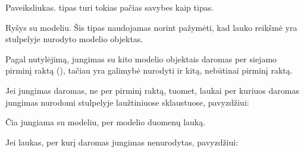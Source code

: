\documentclass[letterpaper,10pt,lithuanian]{sphinxmanual}
\begin{document}

\begin{fulllineitems}
\label{\detokenize{tipai:type.image}}
\pysigstartsignatures
\pysigline
{}
\pysigstopsignatures
\sphinxAtStartPar
Paveiksliukas.  tipas turi tokias pačias savybes kaip 
tipas.

\end{fulllineitems}


\begin{fulllineitems}
\label{\detokenize{tipai:type.ref}}
\pysigstartsignatures
\pysigline
{}
\pysigstopsignatures
\sphinxAtStartPar
Ryšys su modeliu. Šis tipas naudojamas norint pažymėti, kad lauko
reikšmė yra {\hyperref[\detokenize{dimensijos:property.ref}]{}} stulpelyje nurodyto modelio objektas.

\sphinxAtStartPar
Pagal nutylėjimą, jungimas su kito modelio objektais daromas per siejamo
pirminį raktą ({\hyperref[\detokenize{dimensijos:model.ref}]{}}), tačiau yra galimybė nurodyti ir kitą,
nebūtinai pirminį raktą.

\sphinxAtStartPar
Jei jungimas daromas, ne per pirminį raktą, tuomet, laukai per kuriuos
daromas jungimas nurodomi {\hyperref[\detokenize{dimensijos:property.ref}]{}} stulpelyje laužtiniuose
sklaustuose, pavyzdžiui:

\begin{sphinxVerbatim}[commandchars=\\\{\}]
\PYG{p}{[}\PYG{p}{]}
\end{sphinxVerbatim}

\sphinxAtStartPar
Čia jungiama su  modeliu, per  modelio  duomenų
lauką.

\sphinxAtStartPar
Jei laukas, per kurį daromas jungimas nenurodytas, pavyzdžiui:

\begin{sphinxVerbatim}[commandchars=\\\{\}]
\end{sphinxVerbatim}


\end{fulllineitems}
\end{document}
